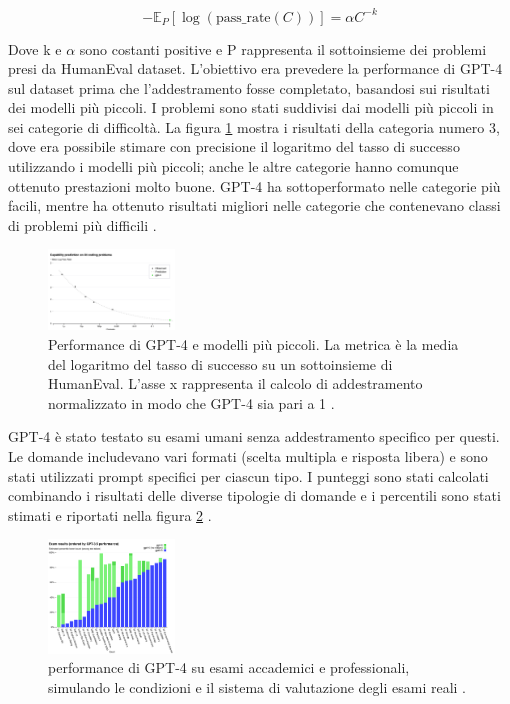 \begin{equation}
- \mathbb{E}_P \left[ \log(\text{pass\_rate}(C)) \right] = \alpha C^{-k}
\label{equ:power_law}
\end{equation}

Dove k e \(\alpha\) sono costanti positive e P rappresenta il sottoinsieme dei problemi presi da HumanEval dataset.
L'obiettivo era prevedere la performance di GPT-4 sul dataset prima che l'addestramento fosse completato, basandosi sui risultati dei modelli più piccoli. I problemi sono stati suddivisi dai modelli più piccoli in sei categorie di difficoltà. La figura \ref{fig:pass-rate} mostra i risultati della categoria numero 3, dove era possibile stimare con precisione il logaritmo del tasso di successo utilizzando i modelli più piccoli; anche le altre categorie hanno comunque ottenuto prestazioni molto buone. GPT-4 ha sottoperformato nelle categorie più facili, mentre ha ottenuto risultati migliori nelle categorie che contenevano classi di problemi più difficili \cite{achiam2023gpt}.

\begin{figure}[ht]
	\centering
	\includegraphics[width=0.3\textwidth]{Immagini/GPT-4_coding_problems.png}
	\caption{ Performance di GPT-4 e modelli più piccoli. La metrica è la media del logaritmo del tasso di successo su un sottoinsieme di HumanEval. L'asse x rappresenta il calcolo di addestramento normalizzato in modo che GPT-4 sia pari a 1 \cite{achiam2023gpt}.}
	\label{fig:pass-rate}
\end{figure}

GPT-4 è stato testato su esami umani senza addestramento specifico per questi.
Le domande includevano vari formati (scelta multipla e risposta libera) e sono stati utilizzati prompt specifici per ciascun tipo.
I punteggi sono stati calcolati combinando i risultati delle diverse tipologie di domande e i percentili sono stati stimati e riportati nella figura \ref{fig:exam-results} \cite{achiam2023gpt}.

\begin{figure}[H]
	\centering
	\includegraphics[width=0.3\textwidth]{Immagini/exam_results.png}
	\caption{ performance di GPT-4 su esami accademici e professionali, simulando le condizioni e il sistema di valutazione degli esami reali \cite{achiam2023gpt}.}
	\label{fig:exam-results}
\end{figure}

